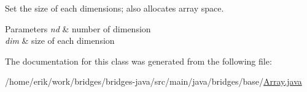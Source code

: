 Set the size of each dimensions; also allocates array space. 


\begin{DoxyParams}{Parameters}
{\em nd} & number of dimension \\
\hline
{\em dim} & size of each dimension \\
\hline
\end{DoxyParams}


The documentation for this class was generated from the following file\+:\begin{DoxyCompactItemize}
\item 
/home/erik/work/bridges/bridges-\/java/src/main/java/bridges/base/\hyperlink{_array_8java}{Array.\+java}\end{DoxyCompactItemize}
